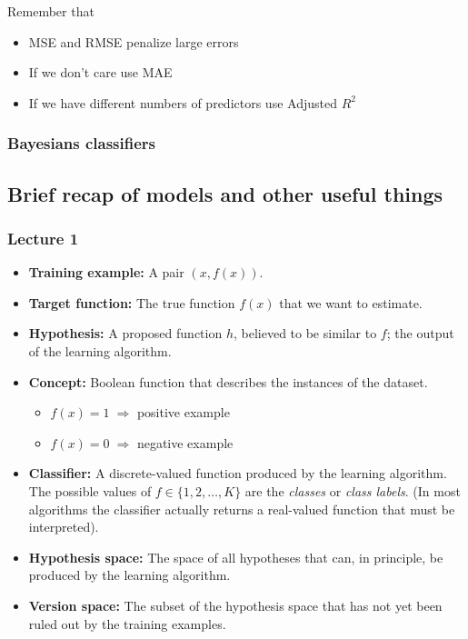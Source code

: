 \vspace{10pt}

Remember that

\begin{itemize}
    \item MSE and RMSE penalize large errors
    \item If we don't care use MAE
    \item If we have different numbers of predictors use Adjusted $R^2$
\end{itemize}



\subsubsection{Bayesians classifiers}
















\subsection{Brief recap of models and other useful things}

\subsubsection{Lecture 1}

\begin{itemize}
    \item \textbf{Training example:} A pair $(x, f(x))$.
    \item \textbf{Target function:} The true function $f(x)$ that we want to estimate.
    \item \textbf{Hypothesis:} A proposed function $h$, believed to be similar to $f$; the output of the learning algorithm.
    \item \textbf{Concept:} Boolean function that describes the instances of the dataset.
          \begin{itemize}
              \item $f(x) = 1 \;\Rightarrow$ positive example
              \item $f(x) = 0 \;\Rightarrow$ negative example 
          \end{itemize}
    \item \textbf{Classifier:} A discrete-valued function produced by the learning algorithm.  
          The possible values of $f \in \{1,2,\dots,K\}$ are the \emph{classes} or \emph{class labels}.  
          (In most algorithms the classifier actually returns a real-valued function that must be interpreted).
    \item \textbf{Hypothesis space:} The space of all hypotheses that can, in principle, be produced by the learning algorithm.
    \item \textbf{Version space:} The subset of the hypothesis space that has not yet been ruled out by the training examples.
\end{itemize}



